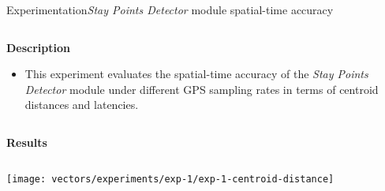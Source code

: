 \begin{frame}{Experimentation}{\emph{Stay Points Detector} module spatial-time accuracy}
\small

\begin{columns}
\begin{column}[T]{0.55\textwidth}

\begin{block}{\small \textbf{Description}}
\begin{itemize}
  \item This experiment evaluates the spatial-time accuracy of the \emph{Stay Points Detector} module under different GPS sampling rates in terms of centroid distances and latencies.
\end{itemize}
\end{block}

\end{column}
\begin{column}[T]{0.45\textwidth}
\begin{table}
\centering
\renewcommand{\arraystretch}{0.6}
\caption{Input parameters for the spatial-time accuracy of stay points experiment.}
\label{tab:exp-1-input-parameters}
\end{table}
\end{column}
\end{columns}

\vspace{-0.5cm}
\begin{block}{\small \textbf{Results}}
\begin{columns}
\begin{column}{0.65\textwidth}
{
  \centering
  \texttt{[image: vectors/experiments/exp-1/exp-1-centroid-distance]}
}
\end{column}
\begin{column}{0.3\textwidth}
\end{column}
\end{columns}


\end{block}
\end{frame}
